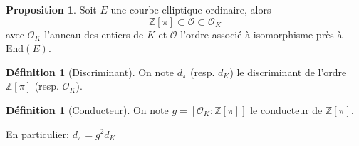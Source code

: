\documentclass[10pt,a4paper]{beamer}
\theoremstyle{plain}
\theoremstyle{definition}
\theoremstyle{definition}
\theoremstyle{definition}
\newtheorem{prop}[thm]{Proposition}
\theoremstyle{definition}
\newtheorem{defi}[thm]{Définition}
\theoremstyle{remark}
\theoremstyle{remark}
\begin{document}
\begin{frame}

\begin{prop}
Soit $E$ une courbe elliptique ordinaire, alors 
\[
\mathbb{Z} \left[ \pi \right] \subset \mathcal{O} \subset \mathcal{O}_K
\] 
avec $\mathcal{O}_K$ l'anneau des entiers de $K$ et $\mathcal{O}$ l'ordre 
associé à isomorphisme près à $\mathrm{End}(E)$. %
\end{prop}

\begin{defi}[Discriminant]
On note $d_{\pi}$ (resp. $d_K$) le discriminant de l'ordre $\mathbb{Z}\left[ \pi \right]$ (resp. $\mathcal{O}_K$).
\end{defi}

\begin{defi}[Conducteur]
On note $g=[\mathcal{O}_K:\mathbb{Z}[\pi]]$ le conducteur de $\mathbb{Z}[\pi]$. %
\end{defi}

En particulier: $d_{\pi}=g^2d_K$

\end{frame}
\end{document}
